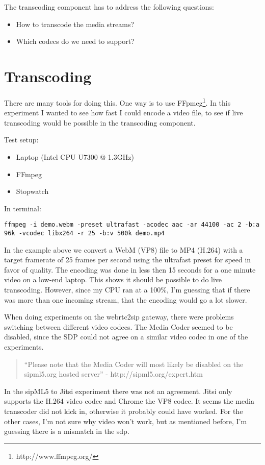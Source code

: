 The transcoding component has to address the following questions:

\begin{itemize}
\item{How to transcode the media streams?}
\item{Which codecs do we need to support?}
\end{itemize}

\section{Transcoding}
There are many tools for doing this. One way is to use FFpmeg\footnote{http://www.ffmpeg.org/}. In this experiment I wanted to see how fast I could encode a video file, to see if live transcoding would be possible in the transcoding component.

Test setup:
\begin{itemize}
\item Laptop (Intel CPU U7300 @ 1.3GHz)
\item FFmpeg
\item Stopwatch
\end{itemize}

In terminal:
\begin{lstlisting}
ffmpeg -i demo.webm -preset ultrafast -acodec aac -ar 44100 -ac 2 -b:a 96k -vcodec libx264 -r 25 -b:v 500k demo.mp4
\end{lstlisting}

In the example above we convert a WebM (VP8) file to MP4 (H.264) with a target framerate of 25 frames per second using the ultrafast preset for speed in favor of quality. The encoding was done in less then 15 seconds for a one minute video on a low-end laptop. This shows it should be possible to do live transcoding. However, since my CPU ran at a 100\%, I'm guessing that if there was more than one incoming stream, that the encoding would go a lot slower.

When doing experiments on the webrtc2sip gateway, there were problems switching between different video codecs. The Media Coder seemed to be disabled, since the SDP could not agree on a similar video codec in one of the experiments.

\begin{quote}
``Please note that the Media Coder will most likely be disabled on the sipml5.org hosted server'' - http://sipml5.org/expert.htm
\end{quote}

In the sipML5 to Jitsi experiment there was not an agreement. Jitsi only supports the H.264 video codec and Chrome the VP8 codec. It seems the media transcoder did not kick in, otherwise it probably could have worked. For the other cases, I'm not sure why video won't work, but as mentioned before, I'm guessing there is a mismatch in the \gls{sdp}.


